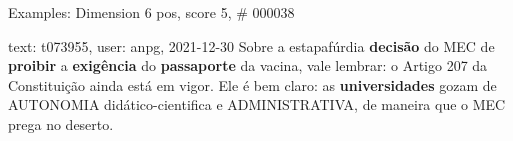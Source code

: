 \begin{frame}{Examples: Dimension 6 pos, score 5, \# 000038}
\footnotesize
\begin{exampleblock}{text: t073955, user: anpg, 2021-12-30}
Sobre a estapafúrdia \textbf{decisão} do MEC de \textbf{proibir} a 
\textbf{exigência} do \textbf{passaporte} da vacina, vale lembrar: o Artigo 207 
da Constituição ainda está em vigor. Ele é bem claro: as \textbf{universidades} 
gozam de AUTONOMIA didático-cientifica e ADMINISTRATIVA, de maneira que o MEC 
prega no deserto. 
\end{exampleblock}
\end{frame}
